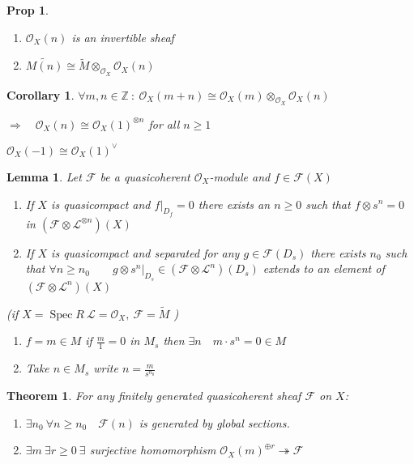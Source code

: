 \documentclass[a4paper, 12pt]{article}
\newcommand{\ca}[1]{\mathcal{#1}}
\newcommand{\caf}{\mathcal{F}}
\newcommand{\oxmod}{$\mathcal{O}_X$-module }
\newcommand{\ox}{\mathcal{O}_X}
\newtheorem*{prop}{Prop}
\newtheorem*{lem}{Lemma}
\newtheorem*{thm}{Theorem}
\newtheorem*{cor}{Corollary}
\DeclareMathOperator{\spec}{Spec}
\begin{document}
	\begin{prop}
		
		\begin{enumerate}
			\item $ \ox(n) $ is an invertible sheaf
			\item $ \tilde{M(n)} \cong \tilde{M} \otimes_{\ox} \ox(n) $
		\end{enumerate}
		
	\end{prop}
	
	\begin{cor}
		$ \forall m,n \in \mathbb{Z} \: : \: \ox(m+n) \cong \ox(m) \otimes_{\ox} \ox(n) $
		
		$ \Rightarrow \quad \ox(n) \cong \ox(1)^{\otimes n}  $ for all $ n\geq 1 $
		
		$ \ox(-1) \cong \ox(1)^{\vee} $
	\end{cor}
	
	\begin{lem}
		Let $ \caf $ be a quasicoherent \oxmod and $ f \in \caf(X) $
		
		\begin{enumerate}
			\item If $ X $ is quasicompact and $ f|_{D_f} = 0 $ there exists an $ n \geq 0 $ such that $ f \otimes s^n = 0 $  in  $ (\caf \otimes \ca{L}^{\otimes n} )(X) $
			\item If $ X $ is quasicompact and separated for any $ g \in \caf (D_s) $ there exists $ n_0 $ such that $ \forall n \geq n_0 \qquad g \otimes s^n|_{D_s} \in (\caf \otimes \ca{L}^n)(D_s) $ extends to an element of $ (\caf \otimes \ca{L}^n) (X) $		
		\end{enumerate}
		
		(if $ X = \spec R \: \ca{L} = \ox , \: \caf = \tilde{M} $ )
		
		\begin{enumerate}
			\item $ f= m \in M $ if $ \frac{m}{1} = 0 $ in $ M_s $ then $ \exists n \quad m\cdot s^n =0 \in M $
			\item Take $ n \in M_s $ write $ n = \frac{m}{s^{n_0}} $ 
		\end{enumerate}
		
	\end{lem}
	
	\begin{thm}
		For any finitely generated quasicoherent sheaf $ \caf $ on $ X $:
		
		\begin{enumerate}
			\item $ \exists n_0 \: \forall n \geq n_0 \quad \caf(n)$ is generated by global sections.
			\item $ \exists m \: \exists r \geq 0 \: \exists $ surjective homomorphism $ \ox(m)^{\oplus r} \twoheadrightarrow \caf $
		\end{enumerate}
	\end{thm}
	
\end{document}
